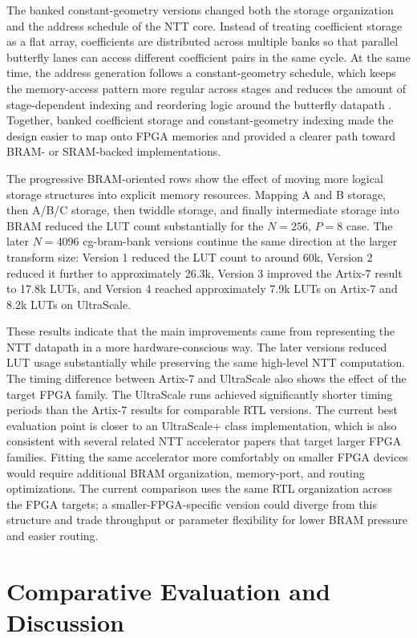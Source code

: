 \documentclass[a4paper, 12pt, titlepage]{article}
\begin{document}
The banked constant-geometry versions changed both the storage organization and
the address schedule of the NTT core. Instead of treating coefficient storage as
a flat array, coefficients are distributed across multiple banks so that
parallel butterfly lanes can access different coefficient pairs in the same
cycle. At the same time, the address generation follows a constant-geometry
schedule, which keeps the memory-access pattern more regular across stages and
reduces the amount of stage-dependent indexing and reordering logic around the
butterfly datapath \cite{area-efficient}. Together, banked
coefficient storage and constant-geometry indexing made the design easier to map
onto FPGA memories and provided a clearer path toward BRAM- or SRAM-backed
implementations.

The progressive BRAM-oriented rows show the effect of moving more logical
storage structures into explicit memory resources. Mapping A and B storage,
then A/B/C storage, then twiddle storage, and finally intermediate storage into
BRAM reduced the LUT count substantially for the \(N=256\), \(P=8\) case. The
later \(N=4096\) cg-bram-bank versions continue the same direction at the larger
transform size: Version 1 reduced the LUT count to around 60k, Version 2 reduced
it further to approximately 26.3k, Version 3 improved the Artix-7 result to
17.8k LUTs, and Version 4 reached approximately 7.9k LUTs on Artix-7 and 8.2k
LUTs on UltraScale.

These results indicate that the main improvements came from representing the NTT
datapath in a more hardware-conscious way. The later versions reduced LUT usage
substantially while preserving the same high-level NTT computation. The timing
difference between Artix-7 and UltraScale also shows the effect of the target
FPGA family. The UltraScale runs achieved significantly shorter timing periods
than the Artix-7 results for comparable RTL versions. The current best
evaluation point is closer to an UltraScale+ class implementation,
which is also consistent with several related NTT accelerator papers that target
larger FPGA families. Fitting the same accelerator more comfortably on smaller
FPGA devices would require additional BRAM organization, memory-port, and
routing optimizations. The current comparison uses the same RTL organization
across the FPGA targets; a smaller-FPGA-specific version could diverge from this
structure and trade throughput or parameter flexibility for lower BRAM pressure
and easier routing.

\newpage
\section{Comparative Evaluation and Discussion}
\end{document}
